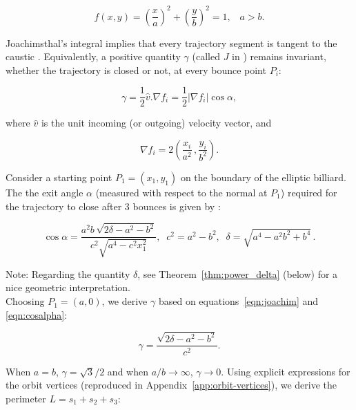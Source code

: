 \documentclass{article}
\theoremstyle{definition}
\begin{document}
\begin{equation}
\label{eqn:billiard-f}
f(x,y)=\left(\frac{x}{a}\right)^2+\left(\frac{y}{b}\right)^2=1,\;\;\;a>b.
\end{equation}

Joachimsthal's integral implies that every trajectory segment is tangent to the caustic \cite{sergei91}. Equivalently, a positive quantity $\gamma$ (called $J$ in \cite{akopyan2020-invariants,bialy2020-invariants}) remains invariant, whether the trajectory is closed or not, at every bounce point $P_i$:

\begin{equation}
 \gamma=\frac{1}{2}\hat{v}.\nabla{f_i}=\frac{1}{2}|\nabla{f_i}|\cos\alpha,
 \label{eqn:joachim}
\end{equation}

\noindent where $\hat{v}$ is the unit incoming (or outgoing) velocity vector, and

\begin{equation*}
\nabla{f_i}=2\left(\frac{x_i}{a^2}\,,\frac{y_i}{b^2}\right).
\label{eqn:fnable}
\end{equation*}

Consider a starting point $P_1=(x_1,y_1)$ on the boundary of the elliptic billiard. The the exit angle $\alpha$ (measured with respect to the normal at $P_1$) required for the trajectory to close after 3 bounces is given by \cite{garcia2019-ellipses}: 

\begin{equation}
\cos{\alpha}={\frac {a^2 b \, \sqrt {2 \delta-{a}^{2}-{b}^{2}}}{{c}^{2}\sqrt {{a}^{4}-{c}^{2} x_1^{2}}}}, \;\; c^2=a^2-b^2,\;\; \delta=\sqrt{a^4-a^2b^2+b^4}\,.
\label{eqn:cosalpha}
\end{equation}

\noindent Note: Regarding the quantity $\delta$, see Theorem~\ref{thm:power_delta} (below) for a nice geometric interpretation. \\

Choosing $P_1=(a,0)$, we derive $\gamma$ based on equations~\eqref{eqn:joachim} and \eqref{eqn:cosalpha}:

\begin{equation}
\gamma=\frac{\sqrt{2\delta-a^2-b^2}}{c^2}.
\end{equation}

\noindent When $a=b$, $\gamma=\sqrt{3}/2$ and when $a/b{\to}\infty$, $\gamma{\to}0$. \noindent Using explicit expressions for the orbit vertices \cite{garcia2019-ellipses} (reproduced in Appendix~\ref{app:orbit-vertices}), we derive the perimeter $L=s_1+s_2+s_3$: 
\end{document}
